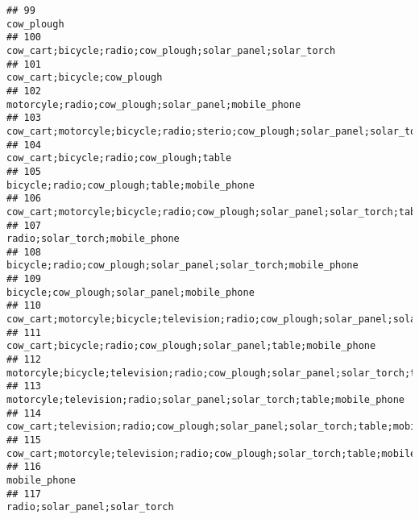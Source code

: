 \documentclass[
]{article}
\begin{document}
\begin{verbatim}
## 99                                                                                                                                cow_plough
## 100                                                                                cow_cart;bicycle;radio;cow_plough;solar_panel;solar_torch
## 101                                                                                                              cow_cart;bicycle;cow_plough
## 102                                                                                      motorcyle;radio;cow_plough;solar_panel;mobile_phone
## 103                                            cow_cart;motorcyle;bicycle;radio;sterio;cow_plough;solar_panel;solar_torch;table;mobile_phone
## 104                                                                                                  cow_cart;bicycle;radio;cow_plough;table
## 105                                                                                              bicycle;radio;cow_plough;table;mobile_phone
## 106                                                   cow_cart;motorcyle;bicycle;radio;cow_plough;solar_panel;solar_torch;table;mobile_phone
## 107                                                                                                           radio;solar_torch;mobile_phone
## 108                                                                            bicycle;radio;cow_plough;solar_panel;solar_torch;mobile_phone
## 109                                                                                              bicycle;cow_plough;solar_panel;mobile_phone
## 110                                        cow_cart;motorcyle;bicycle;television;radio;cow_plough;solar_panel;solar_torch;table;mobile_phone
## 111                                                                         cow_cart;bicycle;radio;cow_plough;solar_panel;table;mobile_phone
## 112                                                 motorcyle;bicycle;television;radio;cow_plough;solar_panel;solar_torch;table;mobile_phone
## 113                                                                    motorcyle;television;radio;solar_panel;solar_torch;table;mobile_phone
## 114                                                          cow_cart;television;radio;cow_plough;solar_panel;solar_torch;table;mobile_phone
## 115                                                            cow_cart;motorcyle;television;radio;cow_plough;solar_torch;table;mobile_phone
## 116                                                                                                                             mobile_phone
## 117                                                                                                            radio;solar_panel;solar_torch

\end{verbatim}
\end{document}
